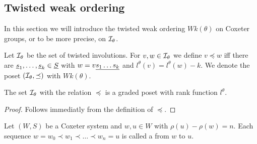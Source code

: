 \subsection{Twisted weak ordering}
\label{sec:twisted-involutions-twisted-weak-ordering}

In this section we will introduce the twisted weak ordering $Wk(\theta)$ on Coxeter groups, or to be more precise, on $\mathcal{I}_{\theta}$.

\begin{defi}
	Let $\mathcal{I}_{\theta}$ be the set of twisted involutions. For $v,w \in \mathcal{I}_{\theta}$ we define $v \preceq w$ iff there are $\underline{s}_1, \ldots, \underline{s}_k \in \underline{S}$ with $w = v \underline{ s_1 \ldots s_k }$ and $l^\theta(v) = l^\theta(w) - k$. We denote the poset $(\mathcal{I}_{\theta},\preceq)$ with $Wk(\theta)$.
\end{defi}

\begin{lemm}
	The set $\mathcal{I}_{\theta}$ with the relation $\preceq$ is a graded poset with rank function $l^\theta$.

	\begin{proof}
		Follows immediatly from the definition of $\preceq$.
	\end{proof}
\end{lemm}

\begin{defi}
	Let $(W,S)$ be a Coxeter system and $w,u \in W$ with $\rho(u) - \rho(w) = n$. Each sequence $w = w_0 \prec w_1 \prec \ldots \prec w_n = u$ is called a  from $w$ to $u$.
\end{defi}

\todo